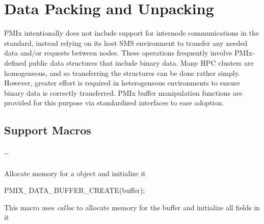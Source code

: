 \chapter{Data Packing and Unpacking}
\label{chap:api_data_mgmt}

\ac{PMIx} intentionally does not include support for internode communications in the standard, instead relying on its host \ac{SMS} environment to transfer any needed data and/or requests between nodes. These operations frequently involve PMIx-defined public data structures that include binary data. Many \ac{HPC} clusters are homogeneous, and so transferring the structures can be done rather simply. However, greater effort is required in heterogeneous environments to ensure binary data is correctly transferred. \ac{PMIx} buffer manipulation functions are provided for this purpose via standardized interfaces to ease adoption.

\section{Support Macros}
\label{chap:api_init:macros}

\ldots

\subsection{}

\summary

Allocate memory for a  object and initialize it

\format

\cspecificstart
\begin{codepar}
PMIX_DATA_BUFFER_CREATE(buffer);
\end{codepar}
\cspecificend

\begin{arglist}
\end{arglist}

\descr

This macro uses \textit{calloc} to allocate memory for the buffer and initialize all fields in it


